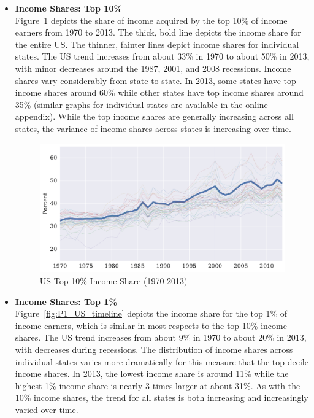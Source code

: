 \documentclass[11pt]{article}
\theoremstyle{definition}
\numberwithin{equation}{section}
\begin{document}
\begin{itemize}
	
	\item {\bf Income Shares: Top 10\%}\\
	Figure~\ref{fig:P10_US_timeline} depicts the share of income acquired by the top 10\% of income earners from 1970 to 2013. The thick, bold line depicts the income share for the entire US. The thinner, fainter lines depict income shares for individual states. The US trend increases from about 33\% in 1970 to about 50\% in 2013, with minor decreases around the 1987, 2001, and 2008 recessions. Income shares vary considerably from state to state. In 2013, some states have top income shares around 60\% while other states have top income shares around 35\% (similar graphs for individual states are available in the online appendix). While the top income shares are generally increasing across all states, the variance of income shares across states is increasing over time.

	\begin{figure}[htb!]  	
	\begin{center}	
	\caption{US Top 10\% Income Share (1970-2013) \label{fig:P10_US_timeline}}	
	\includegraphics[width=6.3in]{../figures/inc_inequality/UnitedStates_Inc10_timeline.pdf}
	\end{center}
	\end{figure}


	\item {\bf Income Shares: Top 1\%}\\
	 Figure~\ref{fig:P1_US_timeline} depicts the income share for the top 1\% of income earners, which is similar in most respects to the top 10\% income shares. The US trend increases from about 9\% in 1970 to about 20\% in 2013, with decreases during recessions. The distribution of income shares across individual states varies more dramatically for this measure that the top decile income shares. In 2013, the lowest income share is around 11\% while the highest 1\% income share is nearly 3 times larger at about 31\%. As with the 10\% income shares, the trend for all states is both increasing and increasingly varied over time.


\end{itemize}
\end{document}
